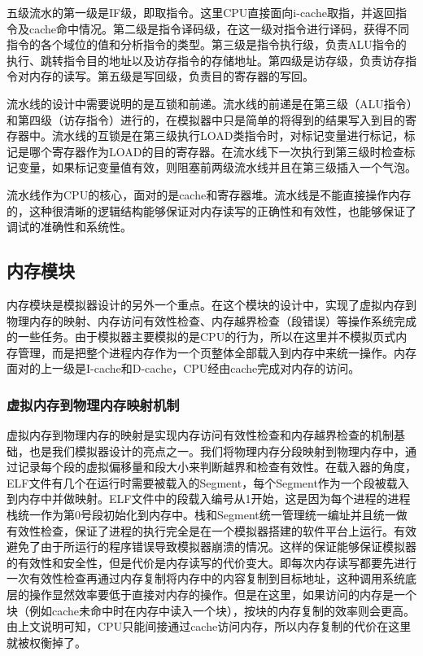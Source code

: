 \documentclass[12pt,a4paper]{article}
\begin{document}
五级流水的第一级是IF级，即取指令。这里CPU直接面向i-cache取指，并返回指令及cache命中情况。第二级是指令译码级，在这一级对指令进行译码，获得不同指令的各个域位的值和分析指令的类型。第三级是指令执行级，负责ALU指令的执行、跳转指令目的地址以及访存指令的存储地址。第四级是访存级，负责访存指令对内存的读写。第五级是写回级，负责目的寄存器的写回。

流水线的设计中需要说明的是互锁和前递。流水线的前递是在第三级（ALU指令）和第四级（访存指令）进行的，在模拟器中只是简单的将得到的结果写入到目的寄存器中。流水线的互锁是在第三级执行LOAD类指令时，对标记变量进行标记，标记是哪个寄存器作为LOAD的目的寄存器。在流水线下一次执行到第三级时检查标记变量，如果标记变量值有效，则阻塞前两级流水线并且在第三级插入一个气泡。

流水线作为CPU的核心，面对的是cache和寄存器堆。流水线是不能直接操作内存的，这种很清晰的逻辑结构能够保证对内存读写的正确性和有效性，也能够保证了调试的准确性和系统性。


\subsection{内存模块}
内存模块是模拟器设计的另外一个重点。在这个模块的设计中，实现了虚拟内存到物理内存的映射、内存访问有效性检查、内存越界检查（段错误）等操作系统完成的一些任务。由于模拟器主要模拟的是CPU的行为，所以在这里并不模拟页式内存管理，而是把整个进程内存作为一个页整体全部载入到内存中来统一操作。内存面对的上一级是I-cache和D-cache，CPU经由cache完成对内存的访问。

\subsubsection{虚拟内存到物理内存映射机制}
虚拟内存到物理内存的映射是实现内存访问有效性检查和内存越界检查的机制基础，也是我们模拟器设计的亮点之一。我们将物理内存分段映射到物理内存中，通过记录每个段的虚拟偏移量和段大小来判断越界和检查有效性。在载入器的角度，ELF文件有几个在运行时需要被载入的Segment，每个Segment作为一个段被载入到内存中并做映射。ELF文件中的段载入编号从1开始，这是因为每个进程的进程栈统一作为第0号段初始化到内存中。栈和Segment统一管理统一编址并且统一做有效性检查，保证了进程的执行完全是在一个模拟器搭建的软件平台上运行。有效避免了由于所运行的程序错误导致模拟器崩溃的情况。这样的保证能够保证模拟器的有效性和安全性，但是代价是内存读写的代价变大。即每次内存读写都要先进行一次有效性检查再通过内存复制将内存中的内容复制到目标地址，这种调用系统底层的操作显然效率要低于直接对内存的操作。但是在这里，如果访问的内存是一个块（例如cache未命中时在内存中读入一个块），按块的内存复制的效率则会更高。由上文说明可知，CPU只能间接通过cache访问内存，所以内存复制的代价在这里就被权衡掉了。
\end{document}
